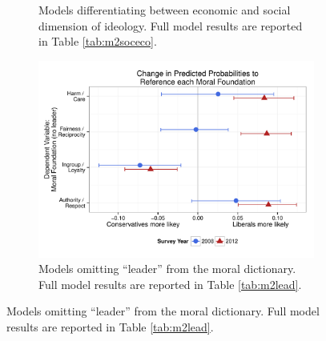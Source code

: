 \documentclass[12pt]{article}
\begin{document}
\begin{figure}[h]
\begin{subfigure}[t]{0.49\textwidth}
    \caption{Models differentiating between economic and social dimension of ideology. Full model results are reported in Table \ref{tab:m2soceco}.}\label{fig:appD2soceco}
  \end{subfigure}
  \begin{subfigure}[t]{0.49\textwidth}
    \includegraphics[scale=.4]{../calc/fig/appD3lead.pdf}
    \caption{Models omitting ``leader'' from the moral dictionary. Full model results are reported in Table \ref{tab:m2lead}.}\label{fig:appD3lead}
  \end{subfigure}
\end{figure}
\end{document}
